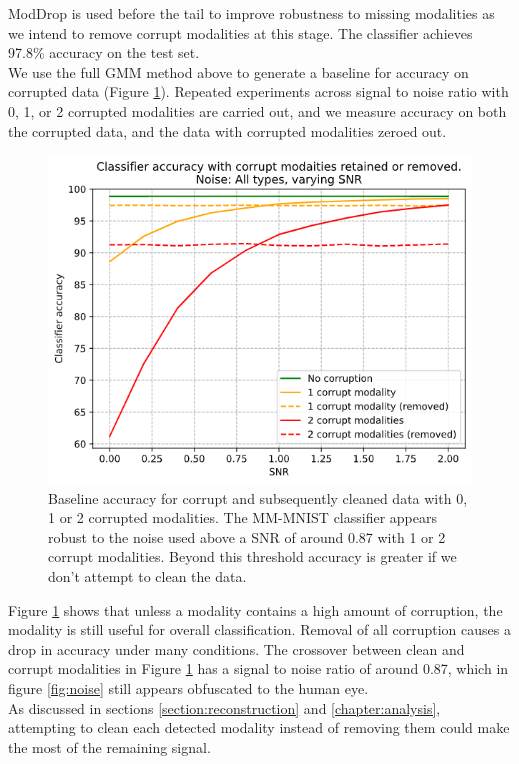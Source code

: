 ModDrop \cite{ModDrop} is used before the tail to improve robustness to missing modalities as we intend to remove corrupt modalities at this stage. The classifier achieves 97.8\% accuracy on the test set.\\

We use the full GMM method above to generate a baseline for accuracy on corrupted data (Figure \ref{fig:baseline}). Repeated experiments across signal to noise ratio with 0, 1, or 2 corrupted modalities are carried out, and we measure accuracy on both the corrupted data, and the data with corrupted modalities zeroed out.\\

\begin{figure}[H]
    \centering\captionsetup{width=.8\linewidth}
    \includegraphics[width=.6\textwidth]{images/classifier_baseline.png}
    \caption{Baseline accuracy for corrupt and subsequently cleaned data with 0, 1 or 2 corrupted modalities. The MM-MNIST classifier appears robust to the noise used above a SNR of around 0.87 with 1 or 2 corrupt modalities. Beyond this threshold accuracy is greater if we don't attempt to clean the data.}
    \label{fig:baseline}
\end{figure}

Figure \ref{fig:baseline} shows that unless a modality contains a high amount of corruption, the modality is still useful for overall classification. Removal of all corruption causes a drop in accuracy under many conditions. The crossover between clean and corrupt modalities in Figure \ref{fig:baseline} has a signal to noise ratio of around 0.87, which in figure \ref{fig:noise} still appears obfuscated to the human eye.\\

As discussed in sections \ref{section:reconstruction} and \ref{chapter:analysis}, attempting to clean each detected modality instead of removing them could make the most of the remaining signal.\\

